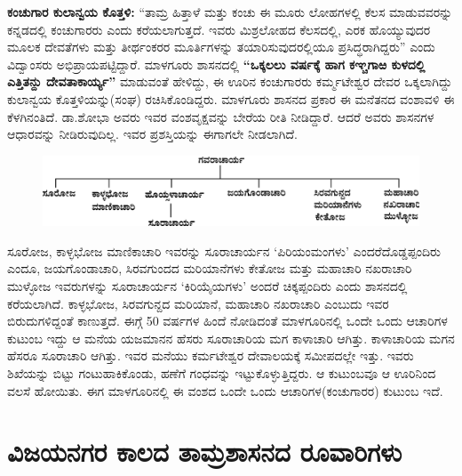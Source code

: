 \textbf{ಕಂಚುಗಾರ ಕುಲಾನ್ವಯ ಕೊತ್ತಳಿ:} “ತಾಮ್ರ ಹಿತ್ತಾಳೆ ಮತ್ತು ಕಂಚು ಈ ಮೂರು ಲೋಹಗಳಲ್ಲಿ ಕೆಲಸ ಮಾಡುವವರನ್ನು ಕನ್ನಡದಲ್ಲಿ ಕಂಚುಗಾರರು ಎಂದು ಕರೆಯಲಾಗುತ್ತದೆ. ಇವರು ಮಿಶ್ರಲೋಹದ ಕೆಲಸದಲ್ಲಿ, ಎರಕ ಹೊಯ್ಯುವುದರ ಮೂಲಕ ದೇವತೆಗಳು ಮತ್ತು ತೀರ್ಥಂಕರರ ಮೂರ್ತಿಗಳನ್ನು ತಯಾರಿಸುವುದರಲ್ಲಿಯೂ ಪ್ರಸಿದ್ಧರಾಗಿದ್ದರು” ಎಂದು ವಿದ್ವಾಂಸರು ಅಭಿಪ್ರಾಯಪಟ್ಟಿದ್ದಾರೆ. ಮಾಳಗೂರು ಶಾಸನದಲ್ಲಿ \textbf{“ಒಕ್ಕಲಲು ವರ್ಷಕ್ಕೆ ಹಾಗ ಕಞ್ಚಗಾಱ ಕುಳದಲ್ಲಿ ಎತ್ತಿತನ್ದು ದೇವತಾಕಾರ್ಯ್ಯ”} ಮಾಡುವಂತೆ ಹೇಳಿದ್ದು, ಈ ಊರಿನ ಕಂಚುಗಾರರು ಕರ್ಮ್ಮಟೇಶ್ವರ ದೇವರ ಒಕ್ಕಲಾಗಿದ್ದು ಕುಲಾನ್ವಯ ಕೊತ್ತಳಿಯನ್ನು(ಸಂಘ) ರಚಿಸಿಕೊಂಡಿದ್ದರು. ಮಾಳಗೂರು ಶಾಸನದ ಪ್ರಕಾರ ಈ ಮನೆತನದ ವಂಶಾವಳಿ ಈ ಕೆಳಗಿನಂತಿದೆ. ಡಾ.ಶೋಭಾ ಅವರು ಇವರ ವಂಶವೃಕ್ಷವನ್ನು ಬೇರೆಯ ರೀತಿ ನೀಡಿದ್ದಾರೆ. ಆದರೆ ಅವರು ಶಾಸನಗಳ ಆಧಾರವನ್ನು ನೀಡಿರುವುದಿಲ್ಲ. ಇವರ ಪ್ರಶಸ್ತಿಯನ್ನು ಈಗಾಗಲೇ ನೀಡಲಾಗಿದೆ.

\begin{figure}[!h]
\includegraphics[scale=.92]{images/chap5/chap5fig4.jpeg}
\end{figure}

ಸೂರೋಜ, ಕಾಳ್ಳಭೋಜ ಮಾಣಿಕಾಚಾರಿ ಇವರನ್ನು ಸೂರಾಚಾರ್ಯನ ‘ಪಿರಿಯಂಮಂಗಳು’ ಎಂದರೆ\break ದೊಡ್ಡಪ್ಪಂದಿರು ಎಂದೂ, ಜಯಗೊಂಡಾಚಾರಿ, ಸಿರವಗುಂದದ ಮರಿಯಾನೆಗಳು ಕೇತೋಜ ಮತ್ತು ಮಹಾಚಾರಿ ನಖರಾಚಾರಿ ಮುಳ್ಳೋಜ ಇವರುಗಳನ್ನು ಸೂರಾಚಾರ್ಯನ ‘ಕಿರಿಯೈಯಗಳು’ ಅಂದರೆ ಚಿಕ್ಕಪ್ಪಂದಿರು ಎಂದು ಶಾಸನದಲ್ಲಿ ಕರೆಯಲಾಗಿದೆ. ಕಾಳ್ಳಭೋಜ, ಸಿರವಗುನ್ದದ ಮರಿಯಾನೆ, ಮಹಾಚಾರಿ ನಖರಾಚಾರಿ ಎಂಬುದು ಇವರ ಬಿರುದುಗಳಿದ್ದಂತೆ ಕಾಣುತ್ತದೆ. ಈಗ್ಗೆ 50 ವರ್ಷಗಳ ಹಿಂದೆ ನೋಡಿದಂತೆ ಮಾಳಗೂರಿನಲ್ಲಿ ಒಂದೇ ಒಂದು ಆಚಾರಿಗಳ ಕುಟುಂಬ ಇದ್ದು ಆ ಮನೆಯ ಯಜಮಾನನ ಹೆಸರು ಸೂರಾಚಾರಿಯ ಮಗ ಕಾಳಾಚಾರಿ ಆಗಿತ್ತು. ಕಾಳಾಚಾರಿಯ ಮಗನ ಹೆಸರೂ ಸೂರಾಚಾರಿ ಆಗಿತ್ತು. ಇವರ ಮನೆಯು ಕರ್ಮಟೇಶ್ವರ ದೇವಾಲಯಕ್ಕೆ ಸಮೀಪದಲ್ಲೇ ಇತ್ತು. ಇವರು ಶಿಖೆಯನ್ನು ಬಿಟ್ಟು ಗಂಟುಹಾಕಿಕೊಂಡು, ಹಣೆಗೆ ಗಂಧವನ್ನು ಇಟ್ಟುಕೊಳ್ಳುತ್ತಿದ್ದರು. ಆ ಕುಟುಂಬವೂ ಆ ಊರಿನಿಂದ ವಲಸೆ ಹೋಯಿತು. ಈಗ ಮಾಳಗೂರಿನಲ್ಲಿ ಈ ವಂಶದ ಒಂದೇ ಒಂದು ಆಚಾರಿಗಳ(ಕಂಚುಗಾರರ) ಕುಟುಂಬ ಇದೆ.


\section*{ವಿಜಯನಗರ ಕಾಲದ ತಾಮ್ರಶಾಸನದ ರೂವಾರಿಗಳು}

\vskip -3pt

